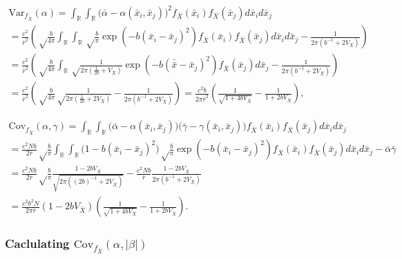 \documentclass[]{article}
\begin{document}
\begin{multline}
\mathrm{Var}_{f_{\bar X}}(\alpha)=
\int_\mathbb{R}\int_\mathbb{R}\big(\bar\alpha-\alpha(\bar x_i,\bar x_j)\big)^2f_{\bar X}(\bar x_i)f_{\bar X}(\bar x_j)d\bar x_id\bar x_j \\
=\frac{c^2}{\bar r^2}\left(\sqrt\frac{b}{4\pi}\int_\mathbb{R}\int_\mathbb{R}\sqrt\frac{b}{\pi}\exp\left(-b(\bar x_i-\bar x_j)^2\right)f_{\bar X}(\bar x_i)f_{\bar X}(\bar x_j)d\bar x_id\bar x_j-\frac{1}{2\pi(b^{-1}+2V_{\bar X})}\right) \\
=\frac{c^2}{\bar r^2}\left(\sqrt\frac{b}{4\pi}\int_\mathbb{R}\sqrt\frac{1}{2\pi(\frac{1}{2b}+V_{\bar X})}\exp\left(-b(\bar{\bar x}-\bar x_j)^2\right)f_{\bar X}(\bar x_j)d\bar x_j-\frac{1}{2\pi(b^{-1}+2V_{\bar X})}\right) \\
=\frac{c^2}{\bar r^2}\left(\sqrt\frac{b}{4\pi}\sqrt\frac{1}{2\pi(\frac{1}{2b}+2V_{\bar X})}-\frac{1}{2\pi(b^{-1}+2V_{\bar X})}\right)=\frac{c^2b}{2\pi\bar r^2}\left(\frac{1}{\sqrt{1+4bV_{\bar X}}}-\frac{1}{1+2bV_{\bar X}}\right),
\end{multline}

\begin{multline}
\mathrm{Cov}_{f_{\bar X}}(\alpha,\gamma)=
\int_\mathbb{R}\int_\mathbb{R}\big(\bar\alpha-\alpha(\bar x_i,\bar x_j)\big)\big(\bar\gamma-\gamma(\bar x_i,\bar x_j)\big)f_{\bar X}(\bar x_i)f_{\bar X}(\bar x_j)d\bar x_id\bar x_j \\
=\frac{c^2Nb}{2\bar r}\sqrt\frac{b}{\pi}\int_\mathbb{R}\int_\mathbb{R}\big(1-b(\bar x_i-\bar x_j)^2\big)\sqrt\frac{b}{\pi}\exp\left(-b(\bar x_i-\bar x_j)^2\right)f_{\bar X}(\bar x_i)f_{\bar X}(\bar x_j)d\bar x_id\bar x_j-\bar\alpha\bar\gamma \\
=\frac{c^2Nb}{2\bar r}\sqrt\frac{b}{\pi}\frac{1-2bV_{\bar X}}{\sqrt{2\pi((2b)^{-1}+2V_{\bar X})}}-\frac{c^2Nb}{\bar r}\frac{1-2bV_{\bar X}}{2\pi(b^{-1}+2V_{\bar X})} \\
=\frac{c^2b^2N}{2\pi\bar r}(1-2bV_{\bar X})\left(\frac{1}{\sqrt{1+4bV_{\bar X}}}-\frac{1}{1+2bV_{\bar X}}\right).
\end{multline}

\hypertarget{caclulating-mathrmcov_f_bar-xalphabeta}{%
\subsubsection{\texorpdfstring{Caclulating
\(\mathrm{Cov}_{f_{\bar X}}(\alpha,|\beta|)\)}{Caclulating \textbackslash{}mathrm\{Cov\}\_\{f\_\{\textbackslash{}bar X\}\}(\textbackslash{}alpha,\textbar{}\textbackslash{}beta\textbar{})}}\label{caclulating-mathrmcov_f_bar-xalphabeta}}
\end{document}
